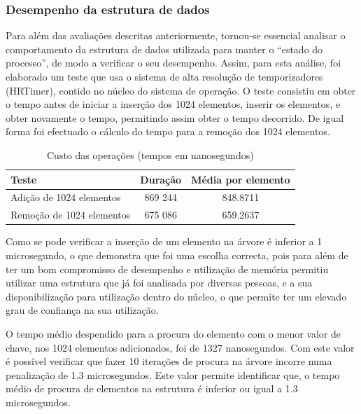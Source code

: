\documentclass[a4paper]{llncs}
\begin{document}
\subsubsection{Desempenho da estrutura de dados}
Para além das avaliações descritas anteriormente, tornou-se essencial analisar o comportamento da estrutura de dados utilizada para manter o “estado do processo”, de modo a verificar o seu desempenho. 
Assim, para esta análise, foi elaborado um teste que usa o sistema de alta resolução de temporizadores (HRTimer), contido no núcleo do sistema de operação.
O teste consistiu em obter o tempo antes de iniciar a inserção dos 1024 elementos, inserir os elementos, e obter novamente o tempo, permitindo assim obter o tempo decorrido. De igual forma foi efectuado o cálculo do tempo para a remoção dos 1024 elementos.

\begin{table}
\begin{center}

\begin{tabular}{ | l | c | c | }
\hline
\hspace{1.2cm} Teste \hspace{1cm} & \hspace{1cm}Duração\hspace{1cm} &  Média por
elemento \\
\hline
Adição de 1024 elementos & 869 244 & 848.8711 \\
\hline
Remoção de 1024 elementos & 675 086 & 659.2637\\
\hline

\hline
\end{tabular}
\caption{Custo das operações (tempos em nanosegundos)}
\label{tab:tree_info}
\end{center}
\end{table}

Como se pode verificar a inserção de um elemento na árvore é inferior a 1 microsegundo, o que demonstra que foi uma escolha correcta, pois para além de ter um bom compromisso de desempenho e utilização de memória permitiu utilizar uma estrutura que já foi analisada por diversas pessoas, e a sua disponibilização para utilização dentro do núcleo, o que permite ter um elevado grau de confiança na sua utilização.

O tempo médio despendido para a procura do elemento com o menor valor de chave, nos 1024 elementos adicionados, foi de 1327 nanosegundos.
 Com este valor é possível verificar que fazer 10 iterações de procura na árvore incorre numa penalização de 1.3 microsegundos.
 Este valor permite identificar que, o tempo médio de procura de elementos na estrutura é inferior ou igual a 1.3 microsegundos.
\end{document}

